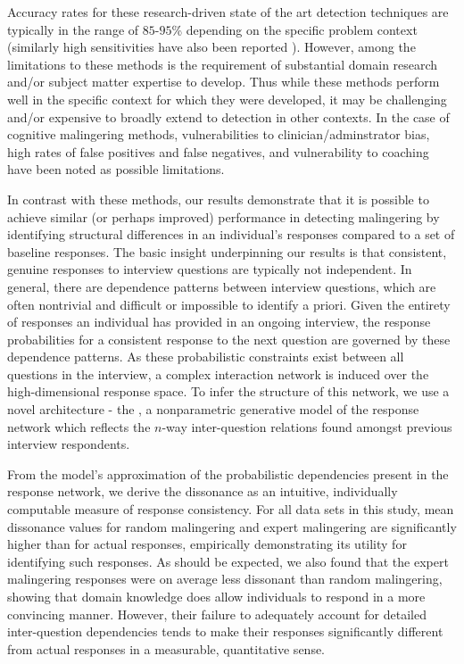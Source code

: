 \documentclass[onecolumn,10pt]{IEEEtran}
\begin{document}
Accuracy rates for these research-driven state of the art detection techniques are typically in the range of $85$-$95$\% depending on the specific problem context\cite{sartori2008accurately,gregg2007vying,monaro2017detection} (similarly high sensitivities have also been reported \cite{smith1997detection}). However, among the limitations to these methods is the requirement of substantial domain research and/or subject matter expertise to develop. Thus while these methods perform well in the specific context for which they were developed, it may be challenging and/or expensive to broadly extend to detection in other contexts. In the case of cognitive malingering methods, vulnerabilities to clinician/adminstrator bias, high rates of false positives and false negatives, and vulnerability to coaching have been noted as possible limitations. 

In contrast with these methods, our results demonstrate that it is possible to achieve similar (or perhaps improved) performance in detecting malingering by identifying structural differences in an individual's responses compared to a set of baseline responses. The basic insight underpinning our results is that consistent, genuine responses to interview questions are typically not independent. In general, there are dependence patterns between interview questions, which are often nontrivial and difficult or impossible to identify a priori. Given the entirety of responses an individual has provided in an ongoing interview, the response probabilities for a consistent response to the next question are governed by these dependence patterns. As these probabilistic constraints exist between all questions in the interview, a complex interaction network is induced over the high-dimensional response space. To infer the structure of this network, we use a novel architecture - the \qnet, a nonparametric generative model of the response network which reflects the $n$-way inter-question relations found amongst previous interview respondents.

From the model's approximation of the probabilistic dependencies present in the response network, we derive the dissonance as an intuitive, individually computable measure of response consistency. For all data sets in this study, mean dissonance values for random malingering and expert malingering are significantly higher than for actual responses, empirically demonstrating its utility for identifying such responses. As should be expected, we also found that the expert malingering responses were on average less dissonant than random malingering, showing that domain knowledge does allow individuals to respond in a more convincing manner. However, their failure to adequately account for detailed inter-question dependencies tends to make their responses significantly different from actual responses in a measurable, quantitative sense. 
\end{document}
